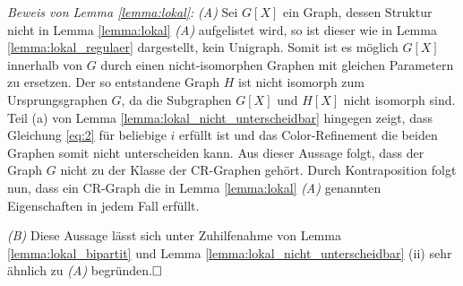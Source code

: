 \emph{Beweis von Lemma \ref{lemma:lokal}:}
\emph{(A)} Sei $G[X]$ ein Graph, dessen Struktur nicht in Lemma \ref{lemma:lokal} \emph{(A)} aufgelistet wird, so ist dieser wie in Lemma \ref{lemma:lokal_regulaer} dargestellt, kein Unigraph. Somit ist es möglich $G[X]$ innerhalb von $G$ durch einen nicht-isomorphen Graphen mit gleichen Parametern zu ersetzen. Der so entstandene Graph $H$ ist nicht isomorph zum Ursprungsgraphen $G$, da die Subgraphen $G[X]$ und $H[X]$ nicht isomorph sind. Teil (a) von Lemma \ref{lemma:lokal_nicht_unterscheidbar} hingegen zeigt, dass Gleichung \ref{eq:2} für beliebige $i$ erfüllt ist und das Color-Refinement die beiden Graphen somit nicht unterscheiden kann. Aus dieser Aussage folgt, dass der Graph $G$ nicht zu der Klasse der CR-Graphen gehört. Durch Kontraposition folgt nun, dass ein CR-Graph die in Lemma \ref{lemma:lokal} \emph{(A)} genannten Eigenschaften in jedem Fall erfüllt.

\emph{(B)} Diese Aussage lässt sich unter Zuhilfenahme von Lemma \ref{lemma:lokal_bipartit} und Lemma \ref{lemma:lokal_nicht_unterscheidbar} (ii) sehr ähnlich zu \emph{(A)} begründen.$\hfill\square$
